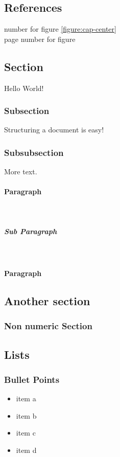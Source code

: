 \documentclass[12pt]{article}
\begin{document}
\pagebreak
\subsection{References}

number for figure \ref{figure:cap-center} \\
page number for figure \pageref{figure:cap-center}

\subsection{Section}

Hello World!

\subsubsection{Subsection}

Structuring a document is easy!

\subsubsection{Subsubsection}

More text.

\paragraph{Paragraph}
\lipsum[1]\\

\subparagraph{Sub Paragraph}
\lipsum[1]\\

\paragraph{Paragraph}
\lipsum[1]

\subsection{Another section}

\subsubsection*{Non numeric Section}

\subsection{Lists}

\subsubsection*{Bullet Points}
\begin{itemize}
\item item a
\item item b
\item item c
\item item d
\end{itemize}
\end{document}

